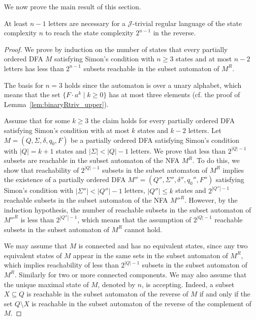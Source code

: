 \documentclass[runningheads]{llncs}
\newcommand{\J}{$\mathcal{J}$}
\begin{document}
  We now prove the main result of this section.
  \begin{theorem}\label{thm:boundJtriv}
    At least $n-1$ letters are necessary for a \J-trivial regular language of the state complexity $n$ to reach the state complexity $2^{n-1}$ in the reverse.
  \end{theorem}
  \begin{proof}
    We prove by induction on the number of states
    that every partially ordered DFA $M$ satisfying Simon's condition with $n\ge 3$ states and at most $n-2$ letters
    has less than $2^{n-1}$ subsets reachable in the subset automaton of $M^R$. 
 
    The basis for $n=3$ holds since the automaton is over a unary alphabet, 
which means that the set $\{F\cdot a^k \mid k\ge 0\}$ has at most three elements (cf. the proof of Lemma~\ref{lem:binaryRtriv_upper}).
    
    Assume that for some $k\ge 3$ the claim holds for every partially ordered DFA satisfying Simon's condition with at most $k$ states and $k-2$ letters. Let $M=(Q,\Sigma,\delta,q_0,F)$ be a partially ordered DFA satisfying Simon's condition with $|Q|=k+1$ states and $|\Sigma|<|Q|-1$ letters. We prove that less than $2^{|Q|-1}$ subsets are reachable in the subset automaton of the NFA $M^R$. To do this, we show that reachability of $2^{|Q|-1}$ subsets in the subset automaton of $M^R$ implies the existence of a partially ordered DFA $M''=(Q'',\Sigma'',\delta'',q_0'',F'')$ satisfying Simon's condition with $|\Sigma''|<|Q''|-1$ letters, $|Q''|\le k$ states and $2^{|Q''|-1}$ reachable subsets in the subset automaton of the NFA $M''^R$. However, by the induction hypothesis, the number of reachable subsets in the subset automaton of $M''^R$ is less than $2^{|Q''|-1}$, which means that the assumption of $2^{|Q|-1}$ reachable subsets in the subset automaton of $M^R$ cannot hold.
    
    We may assume that $M$ is connected and has no equivalent states, since any two equivalent states of $M$ appear in the same sets in the subset automaton of $M^R$, which implies reachability of less than $2^{|Q|-1}$ subsets in the subset automaton of $M^R$. Similarly for two or more connected components. We may also assume that the unique maximal state of $M$, denoted by $n$, is accepting. Indeed, a subset $X\subseteq Q$ is reachable in the subset automaton of the reverse of $M$ if and only if the set $Q\setminus X$ is reachable in the subset automaton of the reverse of the complement of $M$.
    

\end{proof}
\end{document}
